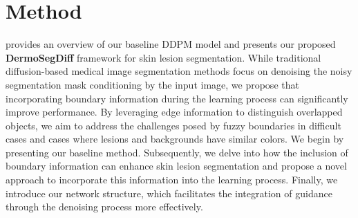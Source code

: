 \documentclass[runningheads]{llncs}
\begin{document}
\section{Method}
 provides an overview of our baseline DDPM model and presents our proposed \textbf{DermoSegDiff} framework for skin lesion segmentation. While traditional diffusion-based medical image segmentation methods focus on denoising the noisy segmentation mask conditioning by the input image, we propose that incorporating boundary information during the learning process can significantly improve performance. By leveraging edge information to distinguish overlapped objects, we aim to address the challenges posed by fuzzy boundaries in difficult cases and cases where lesions and backgrounds have similar colors. We begin by presenting our baseline method. Subsequently, we delve into how the inclusion of boundary information can enhance skin lesion segmentation and propose a novel approach to incorporate this information into the learning process. Finally, we introduce our network structure, which facilitates the integration of guidance through the denoising process more effectively.
\end{document}
